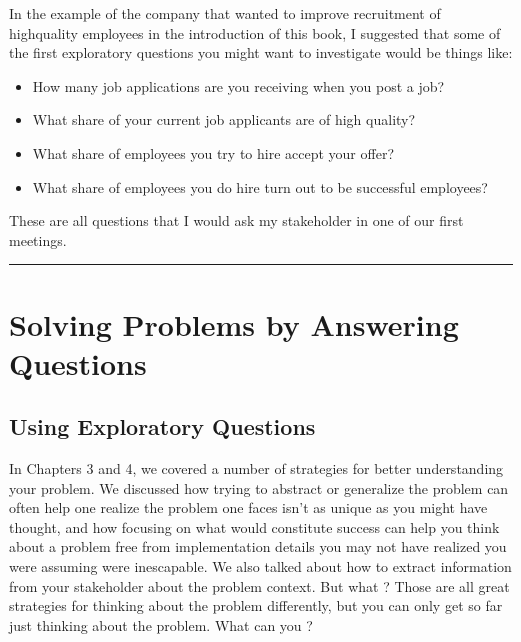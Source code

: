 \documentclass[letterpaper,10pt,english]{jupyterBook}
\begin{document}
\sphinxAtStartPar
In the example of the company that wanted to improve recruitment of high\sphinxhyphen{}quality employees in the introduction of this book, I suggested that some of the first exploratory questions you might want to investigate would be things like:
\begin{itemize}
\item {} 
\sphinxAtStartPar
How many job applications are you receiving when you post a job?

\item {} 
\sphinxAtStartPar
What share of your current job applicants are of high quality?

\item {} 
\sphinxAtStartPar
What share of employees you try to hire accept your offer?

\item {} 
\sphinxAtStartPar
What share of employees you do hire turn out to be successful employees?

\end{itemize}

\sphinxAtStartPar
These are all questions that I would ask my stakeholder in one of our first meetings.


\bigskip\hrule\bigskip


\sphinxstepscope


\part{Solving Problems by Answering Questions}

\sphinxstepscope


\chapter{Using Exploratory Questions}
\label{\detokenize{30_questions/10_using_exploratory_questions:using-exploratory-questions}}\label{\detokenize{30_questions/10_using_exploratory_questions::doc}}
\sphinxAtStartPar
In Chapters 3 and 4, we covered a number of strategies for better understanding your problem. We discussed how trying to abstract or generalize the problem can often help one realize the problem one faces isn’t as unique as you might have thought, and how focusing on what would constitute success can help you think about a problem free from implementation details you may not have realized you were assuming were inescapable. We also talked about how to extract information from your stakeholder about the problem context. But what ? Those are all great strategies for thinking about the problem differently, but you can only get so far just thinking about the problem. What can you ?
\end{document}
